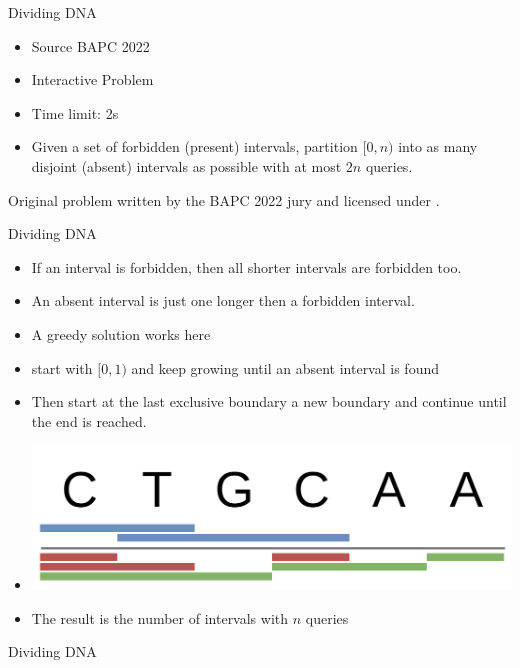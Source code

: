 \documentclass[11pt,pdf, aspectratio=169]{beamer}
\begin{document}
  \begin{frame}{Dividing DNA}
    \begin{itemize}
      \item Source BAPC 2022
      \item Interactive Problem
      \item Time limit: 2s
      \item  Given a set of forbidden (present) intervals, partition $[0,n)$ into as many disjoint (absent) intervals as possible with at most $2n$ queries.

    \end{itemize}
    Original problem written by the BAPC 2022 jury and licensed under \doclicenseLongNameRef.

    \doclicenseImage
  \end{frame}
  \begin{frame}{Dividing DNA}
    \begin{itemize}
      \item If an interval is forbidden, then all shorter intervals are forbidden too.
      \item An absent interval is just one longer then a forbidden interval.
      \item A greedy solution works here
      \item start with $[0,1)$ and keep growing until an absent interval is found
      \item Then start at the last exclusive boundary a new boundary and continue until the end is reached.
      \item \includegraphics[width=.8\linewidth]{images/session-4/bapc-d}
      \item The result is the number of intervals with $n$ queries
    \end{itemize}

  \end{frame}
  \begin{frame}[containsverbatim]{Dividing DNA}
    \inputminted{python}{code/session-4/bapc-d.py}
  \end{frame}
\end{document}

